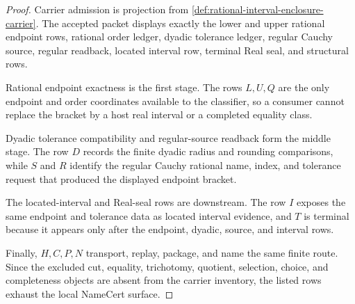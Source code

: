 \begin{proof}
Carrier admission is projection from \autoref{def:rational-interval-enclosure-carrier}. The accepted packet displays exactly the lower and upper rational endpoint rows, rational order ledger, dyadic tolerance ledger, regular Cauchy source, regular readback, located interval row, terminal Real seal, and structural rows.

Rational endpoint exactness is the first stage. The rows $L,U,Q$ are the only endpoint and order coordinates available to the classifier, so a consumer cannot replace the bracket by a host real interval or a completed equality class.

Dyadic tolerance compatibility and regular-source readback form the middle stage. The row $D$ records the finite dyadic radius and rounding comparisons, while $S$ and $R$ identify the regular Cauchy rational name, index, and tolerance request that produced the displayed endpoint bracket.

The located-interval and Real-seal rows are downstream. The row $I$ exposes the same endpoint and tolerance data as located interval evidence, and $T$ is terminal because it appears only after the endpoint, dyadic, source, and interval rows.

Finally, $H,C,P,N$ transport, replay, package, and name the same finite route. Since the excluded cut, equality, trichotomy, quotient, selection, choice, and completeness objects are absent from the carrier inventory, the listed rows exhaust the local NameCert surface.
\end{proof}

